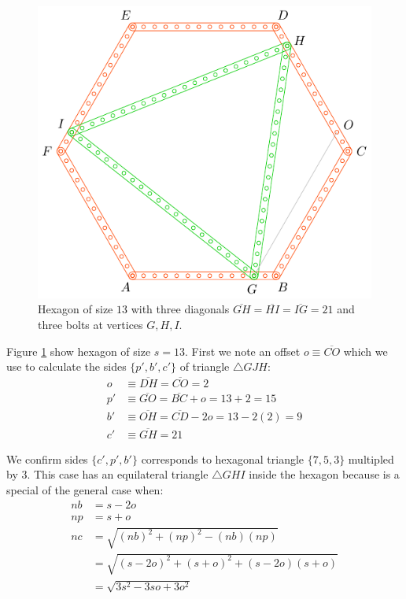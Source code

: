 \documentclass[11pt]{article}
\begin{document}
\begin{figure}[H]
\centering
\includegraphics[scale=1]{13/hexa-13a}
\caption{Hexagon of size $13$ with three diagonals $\overline{GH} = \overline{HI} = \overline{IG} = 21$ and three bolts at vertices $G,H,I$.}
\label{fig:13a}
\end{figure}

Figure \ref{fig:13a} show hexagon of size $s = 13$. First we note an offset $o \equiv \overline{CO}$ which we use to calculate the sides $\{p',b',c'\}$ of triangle $\triangle{GJH}$:
\begin{align}
o &\equiv \overline{DH} = \overline{CO} = 2 \nonumber\\
p' &\equiv \overline{GO} = \overline{BC} + o = 13+2 = 15 \nonumber\\
b' &\equiv \overline{OH} = \overline{CD} - 2o = 13 - 2(2) = 9 \nonumber\\
c' &\equiv \overline{GH} = 21
\end{align}

We confirm sides $\{c',p',b'\}$ corresponds to hexagonal triangle $\{7,5,3\}$ multipled by $3$. This case has an equilateral triangle $\triangle{GHI}$ inside the hexagon because is a special of the general case when:
\begin{align}
nb &= s - 2o \nonumber\\
np &= s + o \nonumber\\
nc &= \sqrt{(nb)^2 + (np)^2 - (nb)(np)} \nonumber\\
   &= \sqrt{(s - 2o)^2 + (s+o)^2 + (s - 2o)(s+o)} \nonumber\\
   &= \sqrt{3s^2 - 3so + 3o^2}
\end{align}
\end{document}
